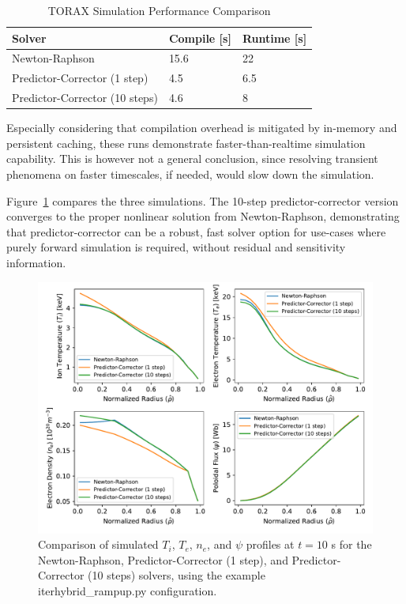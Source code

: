 \documentclass[aps, reprint, nofootinbib]{revtex4-2}
\begin{document}
\begin{table}[ht]
\centering
\caption{TORAX Simulation Performance Comparison}
\label{tab:performance}
\footnotesize %
\begin{tabular}{l p{1.8cm}  p{1.8cm}} %
\hline
\textbf{Solver} & \textbf{Compile [s]} & \textbf{Runtime [s]} \\
\hline
Newton-Raphson & 15.6 & 22 \\
Predictor-Corrector (1 step) & 4.5 & 6.5 \\
Predictor-Corrector (10 steps) & 4.6 & 8 \\
\hline
\end{tabular}
\end{table}

Especially considering that compilation overhead is mitigated by in-memory and persistent caching, these runs demonstrate faster-than-realtime simulation capability. This is however not a general conclusion, since resolving transient phenomena on faster timescales, if needed, would slow down the simulation. 

Figure~\ref{fig:solver_comparison} compares the three simulations. The 10-step predictor-corrector version converges to the proper nonlinear solution from Newton-Raphson, demonstrating that predictor-corrector can be a robust, fast solver option for use-cases where purely forward simulation is required, without residual and sensitivity information.

\begin{figure}[hbt]
    \includegraphics[width=1.0\linewidth]{figure5_solvercomp.pdf}
    \caption{\footnotesize Comparison of simulated $T_i$, $T_e$, $n_e$, and $\psi$ profiles at $t = 10$ s for the Newton-Raphson, Predictor-Corrector (1 step), and Predictor-Corrector (10 steps) solvers, using the example \textsf{iterhybrid\_rampup.py} configuration.}
    \label{fig:solver_comparison}
\end{figure}
\end{document}
